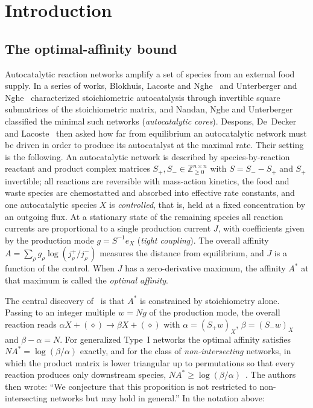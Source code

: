 \documentclass[11pt,reqno]{amsart}
\theoremstyle{plain}
\theoremstyle{definition}
\theoremstyle{remark}
\numberwithin{equation}{section}
\newcommand{\Z}{\mathbb{Z}}
\newcommand{\Sp}{S_{+}}
\newcommand{\Sm}{S_{-}}
\begin{document}
\maketitle
\tableofcontents

\section{Introduction}\label{sec:intro}

\subsection{The optimal-affinity bound}
Autocatalytic reaction networks amplify a set of species from an external food supply.  In a series of works, Blokhuis, Lacoste and Nghe~\cite{BLN20} and Unterberger and Nghe~\cite{UN22} characterized stoichiometric autocatalysis through invertible square submatrices of the stoichiometric matrix, and Nandan, Nghe and Unterberger~\cite{NNU26} classified the minimal such networks (\emph{autocatalytic cores}).  Despons, De~Decker and Lacoste~\cite{DDL24} then asked how far from equilibrium an autocatalytic network must be driven in order to produce its autocatalyst at the maximal rate.  Their setting is the following.  An autocatalytic network is described by species-by-reaction reactant and product complex matrices $\Sp,\Sm\in\Z_{\ge0}^{n\times n}$ with $S=\Sm-\Sp$ and $\Sp$ invertible; all reactions are reversible with mass-action kinetics, the food and waste species are chemostatted and absorbed into effective rate constants, and one autocatalytic species $X$ is \emph{controlled}, that is, held at a fixed concentration by an outgoing flux.  At a stationary state of the remaining species all reaction currents are proportional to a single production current $J$, with coefficients given by the production mode $g=S^{-1}e_X$ (\emph{tight coupling}).  The overall affinity $A=\sum_\rho g_\rho\log(j^+_\rho/j^-_\rho)$ measures the distance from equilibrium, and $J$ is a function of the control.  When $J$ has a zero-derivative maximum, the affinity $A^*$ at that maximum is called the \emph{optimal affinity}.

The central discovery of~\cite{DDL24} is that $A^*$ is constrained by stoichiometry alone.  Passing to an integer multiple $w=Ng$ of the production mode, the overall reaction reads $\alpha X+(\diamond)\to\beta X+(\diamond)$ with $\alpha=(\Sp w)_X$, $\beta=(\Sm w)_X$ and $\beta-\alpha=N$.  For generalized Type~I networks the optimal affinity satisfies $NA^*=\log(\beta/\alpha)$ exactly, and for the class of \emph{non-intersecting} networks, in which the product matrix is lower triangular up to permutations so that every reaction produces only downstream species, $NA^*\ge\log(\beta/\alpha)$~\cite[Eq.~(33) and Supplementary Note~6]{DDL24}.  The authors then wrote: ``We conjecture that this proposition is not restricted to non-intersecting networks but may hold in general.''  In the notation above:
\end{document}
